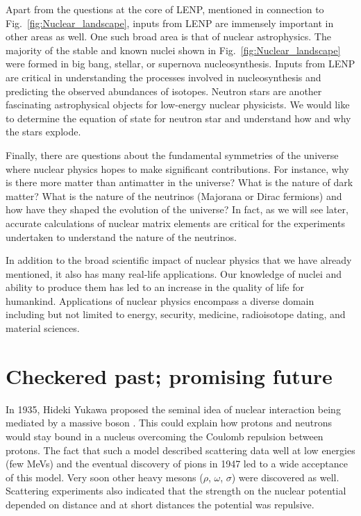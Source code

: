 	Apart from the questions at the core of LENP, mentioned in connection to
	Fig.~\ref{fig:Nuclear_landscape}, inputs from LENP are immensely important
	in other areas as well.  One such broad area is that of nuclear astrophysics.
	The majority of the stable
	and known nuclei shown in Fig.~\ref{fig:Nuclear_landscape} were formed in
	big bang, stellar, or supernova nucleosynthesis.  Inputs from LENP are
	critical in understanding the processes involved in nucleosynthesis and
	predicting the observed abundances of isotopes.
	Neutron stars are another fascinating astrophysical objects for low-energy
	nuclear physicists.  We would like to determine the equation of state for
	neutron star and understand how and why the stars explode.

	Finally, there are questions about the fundamental symmetries of the universe
	where
	nuclear physics hopes to make significant contributions.  For instance,
	why is there more matter than antimatter in the universe?  What is the nature
	of dark matter?  What is the nature of the neutrinos (Majorana or Dirac
	fermions) and how have they shaped the evolution of the universe?
	In fact, as we will see later, accurate calculations of nuclear matrix
	elements are critical for the experiments undertaken to understand the
	nature of the	neutrinos.

	In addition to the broad scientific impact of nuclear physics that we have
	already mentioned, it also has many real-life applications.  Our knowledge of
	nuclei and ability to produce them has led to an increase in the quality of
	life
	for humankind.  Applications of nuclear physics encompass a diverse
	domain including but not limited to energy, security, medicine,
	radioisotope dating, and material sciences.


	\section{Checkered past; promising future}

	In 1935, Hideki Yukawa proposed the seminal idea of nuclear interaction
	being mediated by a massive boson \cite{Yukawa:1935xg}.   This could explain
	how protons and neutrons would stay bound in a nucleus overcoming the Coulomb
	repulsion between protons.  The fact that such a model described scattering
	data well at low energies (few MeVs) and the eventual discovery of pions in
	1947 led to a wide acceptance of this model.  Very soon other heavy mesons
	($\rho$, $\omega$, $\sigma$) were discovered as well.  Scattering experiments
	also indicated that the strength on the nuclear potential depended on
	distance and at short distances the potential was repulsive.

